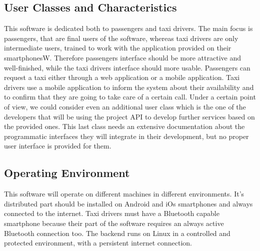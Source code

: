 \subsection{User Classes and Characteristics}
This software is dedicated both to passengers and taxi drivers.
The main focus is passengers, that are final users of the software, whereas taxi drivers are only intermediate users, trained to work with the application provided on their smartphonesW.
Therefore passengers interface should be more attractive and well-finished, while the taxi drivers interface should more usable.
Passengers can request a taxi either through a web application or a mobile application.
Taxi drivers use a mobile application to inform the system about their availability and to confirm that they are going to take care of a certain call.
Under a certain point of view, we could consider even an additional user class which is the one of the developers that will be using the project API to develop further services based on the provided ones.
This last class needs an extensive documentation about the programmatic interfaces they will integrate in their development, but no proper user interface is provided for them.
\subsection{Operating Environment}
This software will operate on different machines in different environments. It's distributed part should be installed on Android and iOs smartphones and always connected to the internet. Taxi drivers must have a Bluetooth capable smartphone because their part of the software requires an always active Bluetooth connection too.
The backend runs on Linux in a controlled and protected environment, with a persistent internet connection.
